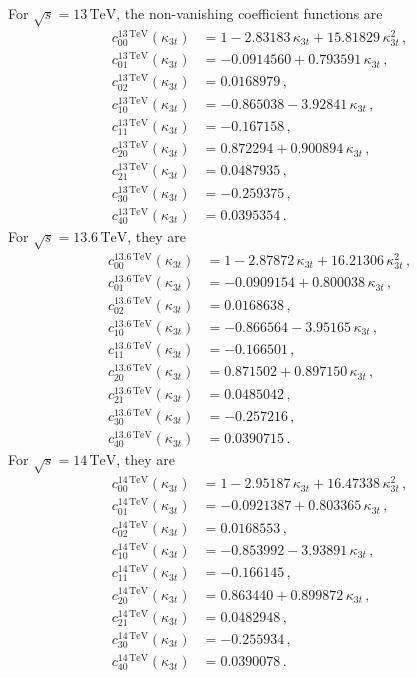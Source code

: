 For $\sqrt{s}=13\,\mathrm{TeV}$, the non-vanishing coefficient functions are
\begin{align}
c_{00}^{13\,\mathrm{TeV}}(\kappa_{3t}) &= 1-2.83183\,\kappa_{3t}+15.81829\,\kappa_{3t}^{2}\,, \\
c_{01}^{13\,\mathrm{TeV}}(\kappa_{3t}) &= -0.0914560+0.793591\,\kappa_{3t}\,, \\
c_{02}^{13\,\mathrm{TeV}}(\kappa_{3t}) &= 0.0168979\,, \\
c_{10}^{13\,\mathrm{TeV}}(\kappa_{3t}) &= -0.865038-3.92841\,\kappa_{3t}\,, \\
c_{11}^{13\,\mathrm{TeV}}(\kappa_{3t}) &= -0.167158\,, \\
c_{20}^{13\,\mathrm{TeV}}(\kappa_{3t}) &= 0.872294+0.900894\,\kappa_{3t}\,, \\
c_{21}^{13\,\mathrm{TeV}}(\kappa_{3t}) &= 0.0487935\,, \\
c_{30}^{13\,\mathrm{TeV}}(\kappa_{3t}) &= -0.259375\,, \\
c_{40}^{13\,\mathrm{TeV}}(\kappa_{3t}) &= 0.0395354\,.
\end{align}
For $\sqrt{s}=13.6\,\mathrm{TeV}$, they are
\begin{align}
c_{00}^{13.6\,\mathrm{TeV}}(\kappa_{3t}) &= 1-2.87872\,\kappa_{3t}+16.21306\,\kappa_{3t}^{2}\,, \\
c_{01}^{13.6\,\mathrm{TeV}}(\kappa_{3t}) &= -0.0909154+0.800038\,\kappa_{3t}\,, \\
c_{02}^{13.6\,\mathrm{TeV}}(\kappa_{3t}) &= 0.0168638\,, \\
c_{10}^{13.6\,\mathrm{TeV}}(\kappa_{3t}) &= -0.866564-3.95165\,\kappa_{3t}\,, \\
c_{11}^{13.6\,\mathrm{TeV}}(\kappa_{3t}) &= -0.166501\,, \\
c_{20}^{13.6\,\mathrm{TeV}}(\kappa_{3t}) &= 0.871502+0.897150\,\kappa_{3t}\,, \\
c_{21}^{13.6\,\mathrm{TeV}}(\kappa_{3t}) &= 0.0485042\,, \\
c_{30}^{13.6\,\mathrm{TeV}}(\kappa_{3t}) &= -0.257216\,, \\
c_{40}^{13.6\,\mathrm{TeV}}(\kappa_{3t}) &= 0.0390715\,.
\end{align}
For $\sqrt{s}=14\,\mathrm{TeV}$, they are
\begin{align}
c_{00}^{14\,\mathrm{TeV}}(\kappa_{3t}) &= 1-2.95187\,\kappa_{3t}+16.47338\,\kappa_{3t}^{2}\,, \\
c_{01}^{14\,\mathrm{TeV}}(\kappa_{3t}) &= -0.0921387+0.803365\,\kappa_{3t}\,, \\
c_{02}^{14\,\mathrm{TeV}}(\kappa_{3t}) &= 0.0168553\,, \\
c_{10}^{14\,\mathrm{TeV}}(\kappa_{3t}) &= -0.853992-3.93891\,\kappa_{3t}\,, \\
c_{11}^{14\,\mathrm{TeV}}(\kappa_{3t}) &= -0.166145\,, \\
c_{20}^{14\,\mathrm{TeV}}(\kappa_{3t}) &= 0.863440+0.899872\,\kappa_{3t}\,, \\
c_{21}^{14\,\mathrm{TeV}}(\kappa_{3t}) &= 0.0482948\,, \\
c_{30}^{14\,\mathrm{TeV}}(\kappa_{3t}) &= -0.255934\,, \\
c_{40}^{14\,\mathrm{TeV}}(\kappa_{3t}) &= 0.0390078\,.
\end{align}
